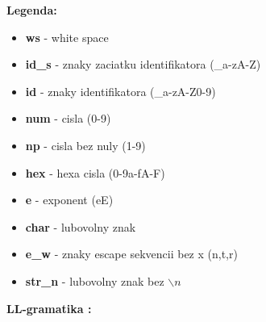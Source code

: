 \documentclass[12pt]{article}
\begin{document}
\textbf{Legenda:}
\small
\begin{multicols}{2}
\begin{itemize}
\item \textbf{ws} - white space
\item \textbf{id\_s} - znaky zaciatku identifikatora (\_a-zA-Z)
\item \textbf{id} - znaky identifikatora (\_a-zA-Z0-9)
\item \textbf{num} - cisla (0-9)
\item \textbf{np} - cisla bez nuly (1-9)
\item \textbf{hex} - hexa cisla (0-9a-fA-F)
\item \textbf{e} - exponent (eE)
\item \textbf{char} - lubovolny znak
\item \textbf{e\_w} - znaky escape sekvencii bez x (n,t,r)
\item \textbf{str\_n} - lubovolny znak bez $\backslash n$
\end{itemize}
\end{multicols}



\newpage

 \Large \textbf{LL-gramatika :} \\ \normalsize
\noindent\makebox[\linewidth]{\rule{\textwidth}{0.4pt}}
\end{document}

